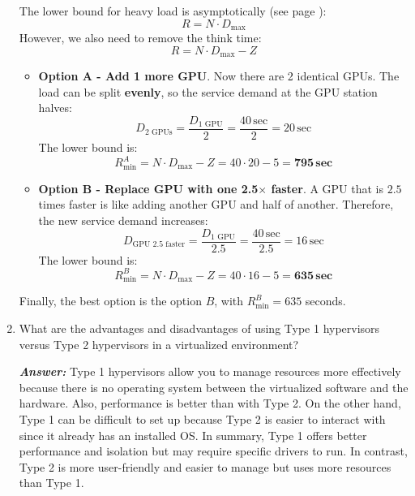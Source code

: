 \begin{enumerate}
    \highspace
    The lower bound for heavy load is asymptotically (see page \pageref{eq: lower bound for heavy load}):
    \begin{equation*}
        R = N \cdot D_{\max}
    \end{equation*}
    However, we also need to remove the think time:
    \begin{equation*}
        R = N \cdot D_{\max} - Z
    \end{equation*}
    \begin{itemize}
        \item \textbf{Option A - Add 1 more GPU}. Now there are 2 identical GPUs. The load can be split \textbf{evenly}, so the service demand at the GPU station halves:
        \begin{equation*}
            D_{\text{2 GPUs}} = \dfrac{D_{\text{1 GPU}}}{2} = \dfrac{40 \, \text{sec}}{2} = 20 \, \text{sec}
        \end{equation*}
        The lower bound is:
        \begin{equation*}
            R_{\min}^{A} = N \cdot D_{\max} - Z = 40 \cdot 20 - 5 = \mathbf{795} \, \textbf{sec}
        \end{equation*}
        \item \textbf{Option B - Replace GPU with one 2.5$\times$ faster}. A GPU that is $2.5$ times faster is like adding another GPU and half of another. Therefore, the new service demand increases:
        \begin{equation*}
            D_{\text{GPU 2.5 faster}} = \dfrac{D_{\text{1 GPU}}}{2.5} = \dfrac{40 \, \text{sec}}{2.5} = 16 \, \text{sec}
        \end{equation*}
        The lower bound is:
        \begin{equation*}
            R_{\min}^{B} = N \cdot D_{\max} - Z = 40 \cdot 16 - 5 = \mathbf{635} \, \textbf{sec}
        \end{equation*}
    \end{itemize}
    Finally, the best option is the option $B$, with $R_{\min}^{B} = 635$ seconds.

    \newpage

    \item What are the advantages and disadvantages of using Type 1 hypervisors versus Type 2 hypervisors in a virtualized environment?
    
    \textcolor{Green3}{\textbf{\emph{Answer:}}} Type 1 hypervisors allow you to manage resources more effectively because there is no operating system between the virtualized software and the hardware. Also, performance is better than with Type 2. On the other hand, Type 1 can be difficult to set up because Type 2 is easier to interact with since it already has an installed OS. In summary, Type 1 offers better performance and isolation but may require specific drivers to run. In contrast, Type 2 is more user-friendly and easier to manage but uses more resources than Type 1.
    

\end{enumerate}
